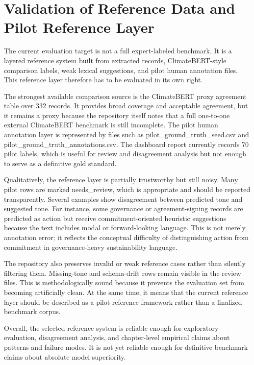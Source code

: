 \documentclass[english, online, cse, master]{dithesis}
\begin{document}
\section{Validation of Reference Data and Pilot Reference Layer}

The current evaluation target is not a full expert-labeled benchmark. It is a layered reference system built from extracted records, ClimateBERT-style comparison labels, weak lexical suggestions, and pilot human annotation files. This reference layer therefore has to be evaluated in its own right.

The strongest available comparison source is the ClimateBERT proxy agreement table over 332 records. It provides broad coverage and acceptable agreement, but it remains a proxy because the repository itself notes that a full one-to-one external ClimateBERT benchmark is still incomplete. The pilot human annotation layer is represented by files such as pilot\_ground\_truth\_seed.csv and pilot\_ground\_truth\_annotations.csv. The dashboard report currently records 70 pilot labels, which is useful for review and disagreement analysis but not enough to serve as a definitive gold standard.

Qualitatively, the reference layer is partially trustworthy but still noisy. Many pilot rows are marked needs\_review, which is appropriate and should be reported transparently. Several examples show disagreement between predicted tone and suggested tone. For instance, some governance or agreement-signing records are predicted as action but receive commitment-oriented heuristic suggestions because the text includes modal or forward-looking language. This is not merely annotation error; it reflects the conceptual difficulty of distinguishing action from commitment in governance-heavy sustainability language.

The repository also preserves invalid or weak reference cases rather than silently filtering them. Missing-tone and schema-drift rows remain visible in the review files. This is methodologically sound because it prevents the evaluation set from becoming artificially clean. At the same time, it means that the current reference layer should be described as a pilot reference framework rather than a finalized benchmark corpus.

Overall, the selected reference system is reliable enough for exploratory evaluation, disagreement analysis, and chapter-level empirical claims about patterns and failure modes. It is not yet reliable enough for definitive benchmark claims about absolute model superiority.
\end{document}
